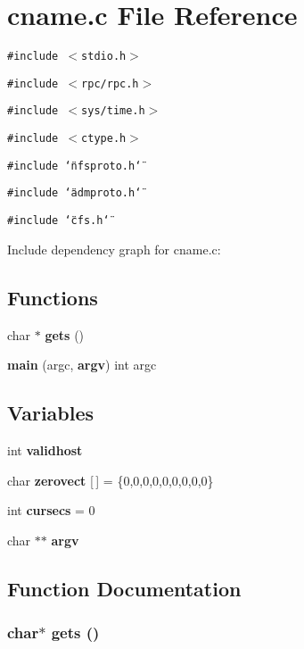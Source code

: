 \section{cname.c File Reference}
\label{cname_8c}


{\tt \#include $<$stdio.h$>$}\par
{\tt \#include $<$rpc/rpc.h$>$}\par
{\tt \#include $<$sys/time.h$>$}\par
{\tt \#include $<$ctype.h$>$}\par
{\tt \#include \char`\"{}nfsproto.h\char`\"{}}\par
{\tt \#include \char`\"{}admproto.h\char`\"{}}\par
{\tt \#include \char`\"{}cfs.h\char`\"{}}\par


Include dependency graph for cname.c:\subsection*{Functions}
\begin{CompactItemize}
\item 
char $\ast$ {\bf gets} ()
\item 
{\bf main} (argc, {\bf argv}) int argc
\end{CompactItemize}
\subsection*{Variables}
\begin{CompactItemize}
\item 
int {\bf validhost}
\item 
char {\bf zerovect} [$\,$] = \{0,0,0,0,0,0,0,0,0\}
\item 
int {\bf cursecs} = 0
\item 
char $\ast$$\ast$ {\bf argv}
\end{CompactItemize}


\subsection{Function Documentation}
\subsubsection{\setlength{\rightskip}{0pt plus 5cm}char$\ast$ gets ()}\label{cname_8c_a4}


